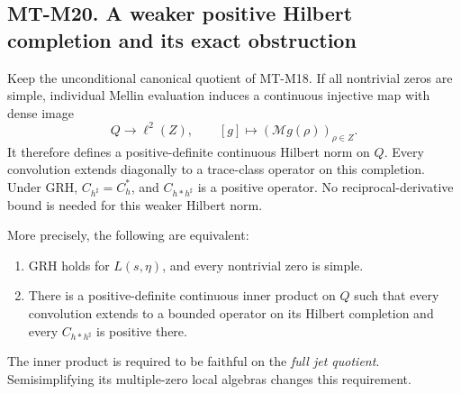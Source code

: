 \documentclass[11pt,a4paper]{article}
\begin{document}
\subsection*{MT-M20. A weaker positive Hilbert completion and its exact obstruction}
Keep the unconditional canonical quotient of MT-M18.
If all nontrivial zeros are simple, individual Mellin
evaluation induces a continuous injective map with dense
image
\[
       Q\longrightarrow\ell^2(Z),\qquad
       [g]\longmapsto(\mathcal Mg(\rho))_{\rho\in Z}.   \tag{M20.1}
\]
It therefore defines a positive-definite continuous Hilbert
norm on \(Q\). Every convolution extends diagonally to a
trace-class operator on this completion. Under GRH,
\(C_{h^\sharp}=C_h^*\), and \(C_{h*h^\sharp}\) is a
positive operator. No reciprocal-derivative bound is
needed for this weaker Hilbert norm.

More precisely, the following are equivalent:
\begin{enumerate}
\item GRH holds for \(L(s,\eta)\), and every nontrivial
zero is simple.
\item There is a positive-definite continuous inner
product on \(Q\) such that every convolution extends to
a bounded operator on its Hilbert completion and every
\(C_{h*h^\sharp}\) is positive there.
\end{enumerate}
The inner product is required to be faithful on the
\emph{full jet quotient}. Semisimplifying its multiple-zero
local algebras changes this requirement.
\end{document}

